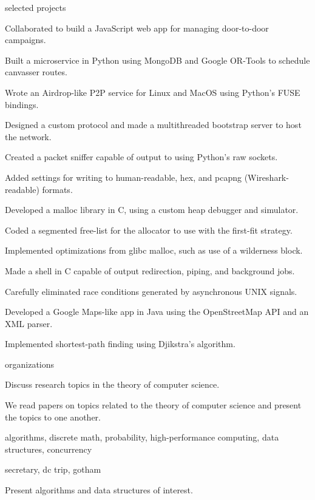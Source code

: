 \documentclass{cv}
\begin{document}
\begin{cvsection}{selected projects}
  {
    \item Collaborated to build a JavaScript web app for managing door-to-door campaigns.
    \item Built a microservice in Python using MongoDB and Google OR-Tools to schedule canvasser routes.
  }
  {
    \item Wrote an Airdrop-like P2P service for Linux and MacOS using Python's FUSE bindings.
    \item Designed a custom protocol and made a multithreaded bootstrap server to host the network.
  }
  {
    \item Created a packet sniffer capable of output to using Python's raw sockets.
    \item Added settings for writing to human-readable, hex, and pcapng (Wireshark-readable) formats.
  }
  {
    \item Developed a malloc library in C, using a custom heap debugger and simulator.
    \item Coded a segmented free-list for the allocator to use with the first-fit strategy.
    \item Implemented optimizations from glibc malloc, such as use of a wilderness block.
  }
  {
    \item Made a shell in C capable of output redirection, piping, and background jobs. 
    \item Carefully eliminated race conditions generated by asynchronous UNIX signals.
  }
  {
    \item Developed a Google Maps-like app in Java using the OpenStreetMap API and an XML parser.
    \item Implemented shortest-path finding using Djikstra's algorithm.
  }
\end{cvsection}

\begin{cvsection}{organizations}
  {
    \item Discuss research topics in the theory of computer science.
    \item We read papers on topics related to the theory of computer science and present the topics to one another.
    \item algorithms, discrete math, probability, high-performance computing, data structures, concurrency
  }
  {
    \item secretary, dc trip, gotham
  }
  {
    \item Present algorithms and data structures of interest.
  } 
\end{cvsection}
\end{document}
